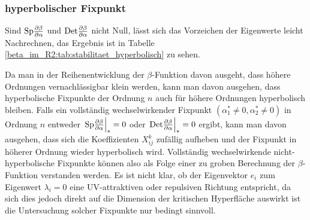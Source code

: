     \subsubsection{hyperbolischer Fixpunkt}
      Sind $\text{Sp} \frac{\partial \beta}{\partial \alpha}$ und $\text{Det} \frac{\partial \beta}{\partial \alpha}$ nicht Null, lässt sich das Vorzeichen der 
      Eigenwerte leicht Nachrechnen, das Ergebnis ist in Tabelle 
      \ref{beta_im_R2:tab:stabilitaet_hyperbolisch} zu sehen.
  
      
      
      Da man in der Reihenentwicklung der $\beta$-Funktion davon ausgeht, 
      dass höhere Ordnungen vernachlässigbar klein werden, kann man davon 
      ausgehen, dass hyperbolische Fixpunkte der 
      Ordnung $n$ auch für höhere Ordnungen hyperbolisch bleiben. Falls ein 
      vollständig wechselwirkender Fixpunkt $(\alpha_1^*\neq 0,
	 \alpha_2^*\neq 0)$ in Ordnung $n$ entweder $\left.\text{Sp} \frac{\partial \beta}{\partial \alpha} \right|_*=0$ 
	 oder $\left. \text{Det} \frac{\partial \beta}{\partial \alpha} \right|_*=0$ ergibt, kann man davon ausgehen, dass 
	 sich die Koeffizienten $X^k_{ij}$ zufällig aufheben und der Fixpunkt in 
	 höherer Ordnung wieder hyperbolisch wird. Vollständig 
	 wechselwirkende nicht-hyperbolische Fixpunkte können also als Folge 
	 einer zu groben Berechnung der $\beta$-Funktion verstanden werden. 
	 Es ist nicht klar, ob der Eigenvektor $e_i$ zum Eigenwert $\lambda_i=0$ 
	 eine UV-attraktiven oder repulsiven Richtung entspricht, da sich dies 
	 jedoch direkt auf die Dimension der kritischen Hyperfläche auswirkt ist 
	 die Untersuchung solcher Fixpunkte nur bedingt sinnvoll.

